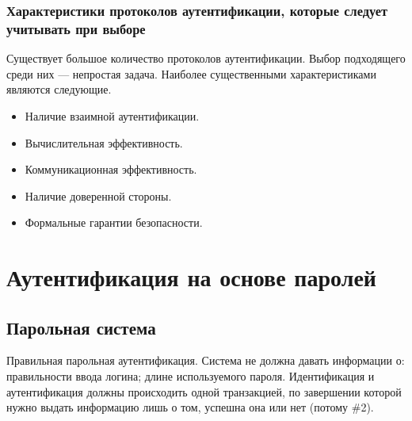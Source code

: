 \begin{frame}
\frametitle{Характеристики протоколов аутентификации, которые следует учитывать при выборе}
Существует большое количество протоколов аутентификации. Выбор подходящего среди них --- непростая задача. Наиболее существенными характеристиками являются следующие.
\begin{itemize}
    \item Наличие взаимной аутентификации.
    \item Вычислительная эффективность.
    \item Коммуникационная эффективность.
    \item Наличие доверенной стороны.
    \item Формальные гарантии безопасности.
\end{itemize}
\end{frame}


\section{Аутентификация на основе паролей}


\subsection{Парольная система}


Правильная парольная аутентификация. Система не должна давать информации о: правильности ввода логина; длине используемого пароля. Идентификация и аутентификация должны происходить одной транзакцией, по завершении которой нужно выдать информацию лишь о том, успешна она или нет (потому \#2). 


